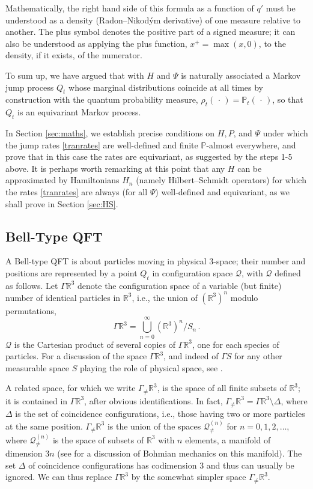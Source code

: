 \documentclass[12pt]{article}
\newcommand{\RRR}{\mathbb{R}} %
\newcommand{\1}{\mathbf{1}} %
\newcommand{\conf}{\mathcal{Q}} %
\newcommand{\measure}{\mathbb{P}} %
\newcommand{\pov}{{P}}%
\newcommand{\Gommo}{\Gamma_{\!\neq}} %
\begin{document}
Mathematically, the right hand side of this formula as a function of
$q'$ must be understood as a density (Radon--Nikod{\'y}m derivative)
of one measure relative to another. The plus symbol denotes the
positive part of a signed measure; it can also be understood as
applying the plus function, $x^+ = \max (x,0)$, to the density, if it
exists, of the numerator.

To sum up, we have argued that with $H$ and $\Psi$ is naturally
associated a Markov jump process $Q_t$ whose marginal distributions
coincide at all times by construction with the quantum probability
measure, $\rho_t(\,\cdot\,) = \measure_t(\,\cdot\,)$, so that $Q_t$ is
an equivariant Markov process.

In Section \ref{sec:maths}, we establish precise conditions on
$H,\pov$, and $\Psi$ under which the jump rates \eqref{tranrates} are
well-defined and finite $\measure$-almost everywhere, and prove that
in this case the rates are equivariant, as suggested by the steps 1-5
above. It is perhaps worth remarking at this point that any $H$ can be
approximated by Hamiltonians $H_n$ (namely Hilbert--Schmidt operators)
for which the rates \eqref{tranrates} are always (for all $\Psi$)
well-defined and equivariant, as we shall prove in Section
\ref{sec:HS}.


\subsection{Bell-Type QFT}
\label{sec:2.6}\label{sec:BellQFT}

A Bell-type QFT is about particles moving in physical 3-space; their
number and positions are represented by a point $Q_t$ in configuration
space $\conf$, with $\conf$ defined as follows. Let $\Gamma \RRR^3$
denote the configuration space of a variable (but finite) number of
identical particles in $\RRR^3$, i.e., the union of $(\RRR^3)^n$
modulo permutations,
\begin{equation}
  \Gamma \RRR^3 = \bigcup_{n=0}^\infty (\RRR^3)^n /S_n \,.
\end{equation}
$\conf$ is the Cartesian product of several copies of $\Gamma \RRR^3$,
one for each species of particles. For a discussion of the space
$\Gamma \RRR^3$, and indeed of $\Gamma S$ for any other
measurable space $S$ playing the role of physical space, see
\cite[Sec.~2.8]{crea2B}.

A related space, for which we write $\Gommo \RRR^3$, is the space of
all finite subsets of $\RRR^3$; it is contained in $\Gamma \RRR^3$,
after obvious identifications. In fact, $\Gommo \RRR^3 = \Gamma \RRR^3
\setminus \Delta$, where $\Delta$ is the set of coincidence
configurations, i.e., those having two or more particles at the same
position.  $\Gommo \RRR^3$ is the union of the spaces
${\conf}^{(n)}_{\neq}$ for $n=0,1,2, \ldots$, where
${\conf}^{(n)}_{\neq}$ is the space of subsets of $\RRR^3$ with $n$
elements, a manifold of dimension $3n$ (see \cite{identical} for a
discussion of Bohmian mechanics on this manifold). The set $\Delta$ of
coincidence configurations has codimension $3$ and thus can usually be
ignored.  We can thus replace $\Gamma \RRR^3$ by the somewhat simpler
space $\Gommo \RRR^3$.
\end{document}
